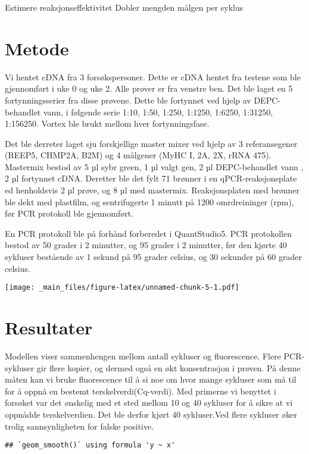 \documentclass[
]{book}
\begin{document}
Estimere reaksjonseffektivitet Dobler mengden målgen per syklus

\hypertarget{metode-1}{%
\section{Metode}\label{metode-1}}

Vi hentet cDNA fra 3 forsøkspersoner. Dette er cDNA hentet fra testene
som ble gjennomført i uke 0 og uke 2. Alle prøver er fra venstre ben.
Det ble laget en 5 fortynningsserier fra disse prøvene. Dette ble
fortynnet ved hjelp av DEPC-behandlet vann, i følgende serie 1:10, 1:50,
1:250, 1:1250, 1:6250, 1:31250, 1:156250. Vortex ble brukt mellom hver
fortynningsfase.

Det ble derreter laget sju forskjellige master mixer ved hjelp av 3
referansegener (REEP5, CHMP2A, B2M) og 4 målgener (MyHC I, 2A, 2X, rRNA
475). Mastermix bestod av 5 µl sybr green, 1 µl valgt gen, 2 µl
DEPC-behandlet vann , 2 µl fortynnet cDNA. Deretter ble det fylt 71
brønner i en qPCR-reaksjonsplate ed henholdsvis 2 µl prøve, og 8 µl med
mastermix. Reaksjonsplaten med brønner ble dekt med plastfilm, og
sentrifugerte 1 minutt på 1200 omrdreininger (rpm), før PCR protokoll
ble gjennomført.

En PCR protokoll ble på forhånd forberedet i QuantStudio5. PCR
protokollen bestod av 50 grader i 2 minutter, og 95 grader i 2 minutter,
før den kjørte 40 sykluser bestående av 1 sekund på 95 grader celsius,
og 30 sekunder på 60 grader celsius.

\texttt{[image: \_main\_files/figure-latex/unnamed-chunk-5-1.pdf]}

\hypertarget{resultater-1}{%
\section{Resultater}\label{resultater-1}}

Modellen viser sammenhengen mellom antall sykluser og fluorescence.
Flere PCR-sykluser gir flere kopier, og dermed også en økt konsentrasjon
i prøven. På denne måten kan vi bruke fluorescence til å si noe om hvor
mange sykluser som må til for å oppnå en bestemt terskelverdi(Cq-verdi).
Med primerne vi benyttet i forsøket var det ønskelig med et sted mellom
10 og 40 sykluser for å sikre at vi oppnådde terskelverdien. Det ble
derfor kjørt 40 sykluser.Ved flere sykluser øker trolig sannsynligheten
for falske positive.

\begin{verbatim}
## `geom_smooth()` using formula 'y ~ x'
\end{verbatim}
\end{document}
